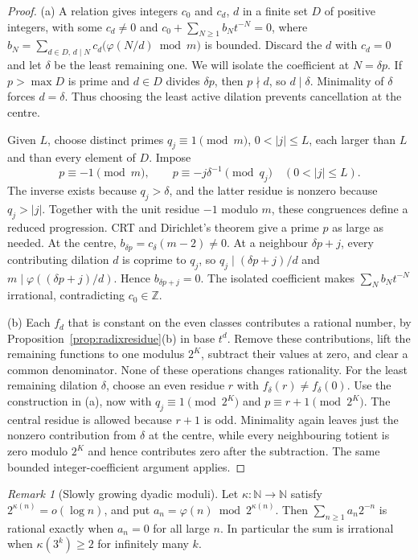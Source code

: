 \documentclass[11pt]{article}
\theoremstyle{plain}
\theoremstyle{definition}
\theoremstyle{remark}
\newtheorem{rem}[thm]{Remark}
\newcommand{\N}{\mathbb{N}}
\newcommand{\Z}{\mathbb{Z}}
\begin{document}
\begin{proof}
(a) A relation gives integers $c_0$ and $c_d$, $d$ in a finite set $D$ of
positive integers, with some $c_d\ne0$ and
$c_0+\sum_{N\ge1}b_Nt^{-N}=0$, where
$b_N=\sum_{d\in D,\,d\mid N}c_d\bigl(\varphi(N/d)\bmod m\bigr)$ is bounded.
Discard the $d$ with $c_d=0$ and let $\delta$ be the least remaining one.
We will isolate the coefficient at $N=\delta p$. If $p>\max D$ is
prime and $d\in D$ divides $\delta p$, then $p\nmid d$, so $d\mid\delta$.
Minimality of $\delta$ forces $d=\delta$. Thus choosing the least
active dilation prevents cancellation at the centre.

Given $L$, choose distinct primes $q_j\equiv1\pmod m$, $0<|j|\le L$,
each larger than $L$ and than every element of $D$. Impose
\[
 p\equiv-1\pmod m,\qquad
 p\equiv-j\delta^{-1}\pmod{q_j}\quad(0<|j|\le L).
\]
The inverse exists because $q_j>\delta$, and the latter residue is
nonzero because $q_j>|j|$. Together with the unit residue $-1$
modulo $m$, these congruences define a reduced progression.
CRT and Dirichlet's theorem give a prime $p$ as large as needed.
At the centre, $b_{\delta p}=c_\delta(m-2)\ne0$.
At a neighbour $\delta p+j$, every contributing dilation $d$ is
coprime to $q_j$, so $q_j\mid(\delta p+j)/d$ and
$m\mid\varphi((\delta p+j)/d)$. Hence $b_{\delta p+j}=0$.
The isolated coefficient makes $\sum_Nb_Nt^{-N}$ irrational,
contradicting $c_0\in\Z$.

(b) Each $f_d$ that is constant on the even classes contributes a rational
number, by Proposition~\ref{prop:radixresidue}(b) in base $t^d$.
Remove these contributions, lift the remaining functions to one
modulus $2^K$, subtract their values at zero, and clear a common
denominator. None of these operations changes rationality.
For the least remaining dilation $\delta$, choose an even residue $r$
with $f_\delta(r)\ne f_\delta(0)$. Use the construction in (a), now
with $q_j\equiv1\pmod{2^K}$ and $p\equiv r+1\pmod{2^K}$.
The central residue is allowed because $r+1$ is odd. Minimality
again leaves just the nonzero contribution from $\delta$ at the
centre, while every neighbouring totient is zero modulo $2^K$
and hence contributes zero after the subtraction. The same bounded
integer-coefficient argument applies.
\end{proof}

\begin{rem}[Slowly growing dyadic moduli]
\label{prop:slowmoduli}
Let $\kappa:\N\to\N$ satisfy $2^{\kappa(n)}=o(\log n)$, and put
$a_n=\varphi(n)\bmod2^{\kappa(n)}$. Then $\sum_{n\ge1}a_n2^{-n}$ is
rational exactly when $a_n=0$ for all large $n$. In particular the sum is
irrational when $\kappa(3^k)\ge2$ for infinitely many $k$.
\end{rem}
\end{document}
